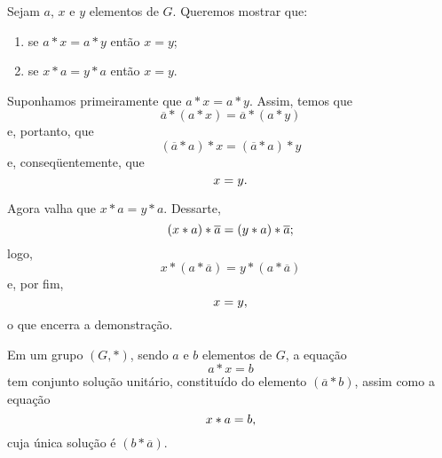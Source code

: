\begin{dem}
  Sejam $a$, $x$ e $y$ elementos de
  $G$. Queremos mostrar que:
  \begin{enumerate}
    \item se $a\ast x = a\ast y$ então $x=y$;
    \item se $x\ast a = y\ast a$ então $x=y$.
  \end{enumerate}

  Suponhamos primeiramente que $a\ast x = a\ast y$. Assim, temos que
  \begin{equation*}
    \overline{a}\ast (a\ast x) = \overline{a}\ast (a\ast y)
  \end{equation*}
  e, portanto, que
  \begin{equation*}
    (\overline{a}\ast a)\ast x = (\overline{a}\ast a)\ast y
  \end{equation*}
  e, conseqüentemente, que
  \begin{equation*}
    x = y\mathrm{.}
  \end{equation*}

  Agora valha que $x\ast a = y\ast a$. Dessarte,
  \begin{equation*}
    (x\ast a)\ast \overline{a} = (y\ast a)\ast \overline{a}\mathrm{;}
  \end{equation*}
  logo,
  \begin{equation*}
    x\ast (a\ast \overline{a}) = y\ast (a\ast \overline{a})
  \end{equation*}
  e, por fim,
  \begin{equation*}
    x = y\mathrm{,}
  \end{equation*}
  o que encerra a demonstração.
\end{dem}

\begin{Propr}\label{propreqgrupo}
  Em um grupo $(G,\ast )$, sendo $a$ e $b$ elementos de $G$, a equação
  \begin{equation}\label{aXb}
    a\ast x = b
  \end{equation}
  tem conjunto solução unitário, constituído do elemento
  $(\overline{a}\ast b)$, assim como a equação
  \begin{equation}\label{Xab}
    x\ast a = b\mathrm{,}
  \end{equation}
  cuja única solução é $(b\ast \overline{a})$.
\end{Propr}

